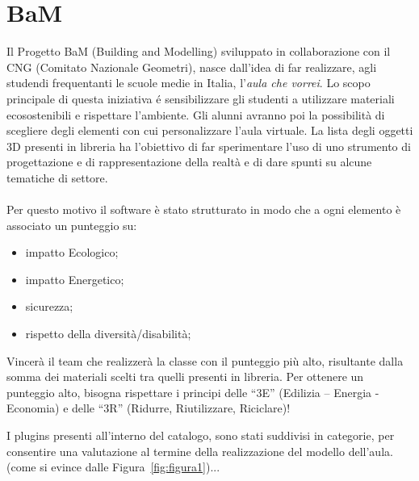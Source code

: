 \section{BaM}
\label{sec:chapter_4_section_1}
Il Progetto BaM (Building and Modelling) sviluppato in collaborazione con il CNG (Comitato Nazionale Geometri),
nasce dall'idea di far realizzare, agli studendi frequentanti le scuole medie in Italia,
l'\emph{aula che vorrei}. Lo scopo principale di questa iniziativa \'e sensibilizzare gli studenti a utilizzare
materiali ecosostenibili e rispettare l'ambiente.
Gli alunni avranno poi la possibilità di scegliere degli elementi con cui personalizzare l’aula virtuale.
La lista degli oggetti 3D presenti in libreria ha l’obiettivo di far sperimentare l’uso di uno strumento di progettazione
e di rappresentazione della realtà e di dare spunti su alcune tematiche di settore.\\
\\Per questo motivo il software è stato strutturato in modo che a ogni elemento è associato un punteggio su:
\begin{itemize}
\item impatto Ecologico;
\item impatto Energetico;
\item sicurezza;
\item rispetto della diversità/disabilità;
\end{itemize}
Vincerà il team che realizzerà la classe con il punteggio più alto, risultante dalla somma dei materiali scelti
tra quelli presenti in libreria. Per ottenere un punteggio alto, bisogna rispettare i principi delle
“3E” (Edilizia – Energia - Economia) e delle “3R” (Ridurre, Riutilizzare, Riciclare)!
\newpage

I plugins presenti all'interno del catalogo, sono stati suddivisi in categorie, per consentire una valutazione al
termine della realizzazione del modello dell'aula.
(come si evince dalle Figura~\ref{fig:figura1})...\\

